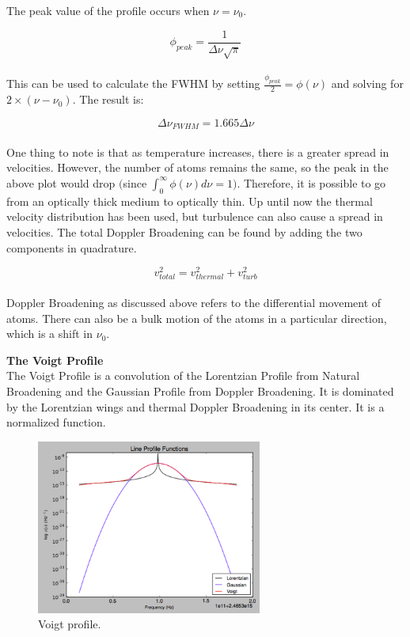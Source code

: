 \documentclass{article}
\begin{document}
The peak value of the profile occurs when $\nu = \nu_{0}$.

$$\phi_{peak} = {\frac{1}{\Delta\nu\sqrt{\pi}}}$$ \\

This can be used to calculate the FWHM by setting ${\frac{\phi_{peak}}{2}} = \phi(\nu)$ and solving for $2\times (\nu-\nu_{0})$. The result is:

$$\Delta\nu_{FWHM} = 1.665\Delta\nu$$ \\

One thing to note is that as temperature increases, there is a greater spread in velocities. However, the number of atoms remains the same, so the peak in the above plot would drop $\bigg($since $\int_{0}^{\infty} \phi(\nu) d\nu = 1\bigg)$. Therefore, it is possible to go from an optically thick medium to optically thin. Up until now the thermal velocity distribution has been used, but turbulence can also cause a spread in velocities. The total Doppler Broadening can be found by adding the two components in quadrature. 

$$v_{total}^{2} = v_{thermal}^{2} + v_{turb}^{2}$$\\

Doppler Broadening as discussed above refers to the differential movement of atoms. There can also be a bulk motion of the atoms in a particular direction, which is a shift in $\nu_{0}$.

\textbf{The Voigt Profile}\\

The Voigt Profile is a convolution of the Lorentzian Profile from Natural Broadening and the Gaussian Profile from Doppler Broadening. It is dominated by the Lorentzian wings and thermal Doppler Broadening in its center. It is a normalized function.

\begin{figure}[ht]
    \centering
    \includegraphics[width=0.66\textwidth]{hw11pic1.png}
    \caption{Voigt profile.}
    \label{fig:voigt1}
\end{figure}
\end{document}
